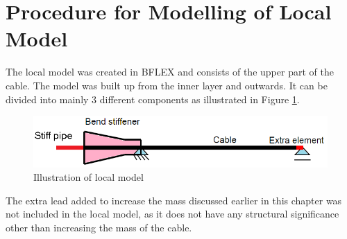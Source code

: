 \section{Procedure for Modelling of Local Model}
The local model was created in BFLEX and consists of the upper part of the cable. The model was built up from the inner layer and outwards. It can be divided into mainly 3 different components as illustrated in Figure \ref{fig:localmod}.
\begin{figure}[H]
\centering
\includegraphics[scale=0.5]{figures/localmod.png}
\caption [$\; \:$Illustration of local model]{Illustration of local model}
 \label{fig:localmod}
\end{figure}
The extra lead added to increase the mass discussed earlier in this chapter was not included in the local model, as it does not have any structural significance other than increasing the mass of the cable.\newline
\newline
